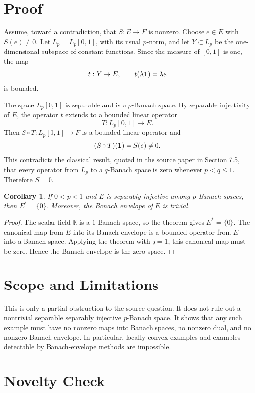 \documentclass[11pt]{article}
\newtheorem{corollary}{Corollary}
\newcommand{\K}{\mathbb K}
\begin{document}
\section*{Proof}

Assume, toward a contradiction, that \(S:E\to F\) is nonzero.  Choose
\(e\in E\) with \(S(e)\neq 0\).  Let \(L_p=L_p[0,1]\), with its usual
\(p\)-norm, and let \(Y\subset L_p\) be the one-dimensional subspace of
constant functions.  Since the measure of \([0,1]\) is one, the map
\[
  t:Y\to E,\qquad t(\lambda {\bf 1})=\lambda e
\]
is bounded.

The space \(L_p[0,1]\) is separable and is a \(p\)-Banach space.  By separable
injectivity of \(E\), the operator \(t\) extends to a bounded linear operator
\[
  T:L_p[0,1]\to E .
\]
Then \(S\circ T:L_p[0,1]\to F\) is a bounded linear operator and
\[
  (S\circ T)({\bf 1})=S(e)\neq 0.
\]
This contradicts the classical result, quoted in the source paper in Section
7.5, that every operator from \(L_p\) to a \(q\)-Banach space is zero whenever
\(p<q\leq 1\).  Therefore \(S=0\).

\begin{corollary}
If \(0<p<1\) and \(E\) is separably injective among \(p\)-Banach spaces, then
\(E^*=\{0\}\).  Moreover, the Banach envelope of \(E\) is trivial.
\end{corollary}

\begin{proof}
The scalar field \(\K\) is a \(1\)-Banach space, so the theorem gives
\(E^*=\{0\}\).  The canonical map from \(E\) into its Banach envelope is a
bounded operator from \(E\) into a Banach space.  Applying the theorem with
\(q=1\), this canonical map must be zero.  Hence the Banach envelope is the
zero space.
\end{proof}

\section*{Scope and Limitations}

This is only a partial obstruction to the source question.  It does not rule
out a nontrivial separable separably injective \(p\)-Banach space.  It shows
that any such example must have no nonzero maps into Banach spaces, no nonzero
dual, and no nonzero Banach envelope.  In particular, locally convex examples
and examples detectable by Banach-envelope methods are impossible.

\section*{Novelty Check}
\end{document}
